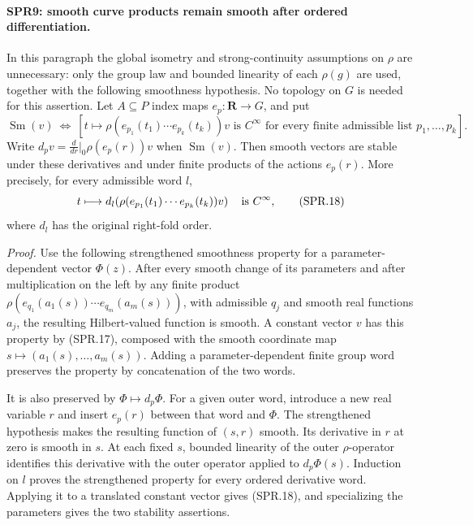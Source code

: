 \documentclass[11pt,a4paper]{article}
\numberwithin{equation}{section}
\theoremstyle{remark}\newtheorem{remark}[theorem]{Remark}
\begin{document}
\paragraph{SPR9: smooth curve products remain smooth after ordered differentiation.}
\label{claim:SPR9}
In this paragraph the global isometry and strong-continuity
assumptions on \(\rho\) are unnecessary: only the group law and
bounded linearity of each \(\rho(g)\) are used, together with
the following smoothness hypothesis.  No topology on \(G\)
is needed for this assertion.
Let \(A\subseteq P\) index maps \(e_p:\mathbf R\to G\), and put
\[
 \operatorname{Sm}(v)\ \Longleftrightarrow\
  \left[t\longmapsto
   \rho(e_{p_1}(t_1)\cdots e_{p_k}(t_k))v
     \text{ is }C^\infty
       \text{ for every finite admissible list }p_1,\ldots,p_k\right].
 \tag{SPR.17}
\]
Write \(d_pv=\frac{d}{dr}|_0\rho(e_p(r))v\) when
\(\operatorname{Sm}(v)\).
Then smooth vectors are stable under these derivatives and under
finite products of the actions \(e_p(r)\).  More precisely, for
every admissible word \(l\),
\[
 t\longmapsto d_l\!
       \left(\rho(e_{p_1}(t_1)\cdots e_{p_k}(t_k))v\right)
           \quad\hbox{is }C^\infty,
 \tag{SPR.18}
\]
where \(d_l\) has the original right-fold order.

\emph{Proof.}
Use the following strengthened smoothness property for a
parameter-dependent vector \(\Phi(z)\).
After every smooth change of its parameters and after multiplication
on the left by any finite product
\(\rho(e_{q_1}(a_1(s))\cdots e_{q_m}(a_m(s)))\), with admissible
\(q_j\) and smooth real functions \(a_j\), the resulting
Hilbert-valued function is smooth.
A constant vector \(v\) has this property by (SPR.17), composed
with the smooth coordinate map
\(s\mapsto(a_1(s),\ldots,a_m(s))\).
Adding a parameter-dependent finite group word preserves the
property by concatenation of the two words.

It is also preserved by \(\Phi\mapsto d_p\Phi\).
For a given outer word, introduce a new real variable \(r\) and
insert \(e_p(r)\) between that word and \(\Phi\).
The strengthened hypothesis makes the resulting function of
\((s,r)\) smooth.  Its derivative in \(r\) at zero is smooth in
\(s\).  At each fixed \(s\), bounded linearity of the outer
\(\rho\)-operator identifies this derivative with the outer
operator applied to \(d_p\Phi(s)\).
Induction on \(l\) proves the strengthened property for every
ordered derivative word.  Applying it to a translated constant
vector gives (SPR.18), and specializing the parameters gives the
two stability assertions.
\end{document}

